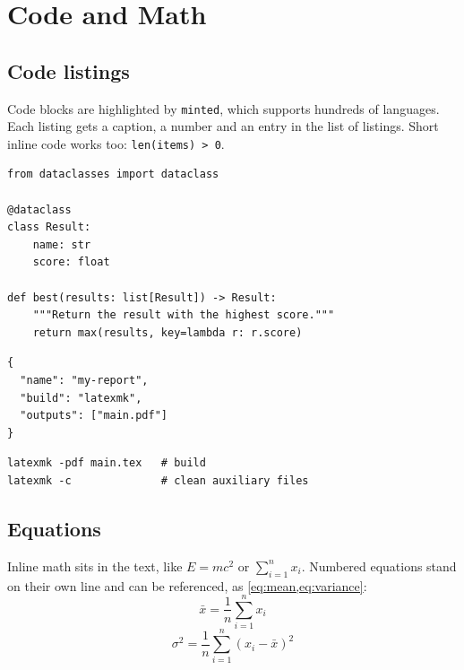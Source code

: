 \chapter{Code and Math}
\label{chap:code-math}

\section{Code listings}

Code blocks are highlighted by \texttt{minted}, which supports hundreds of
languages. Each listing gets a caption, a number and an entry in the list of
listings. Short inline code works too: \texttt{len(items) > 0}.

\begin{listing}[H]
  \begin{verbatim}
from dataclasses import dataclass

@dataclass
class Result:
    name: str
    score: float

def best(results: list[Result]) -> Result:
    """Return the result with the highest score."""
    return max(results, key=lambda r: r.score)
  \end{verbatim}
  \caption{Python.}
  \label{lst:python}
\end{listing}

\begin{listing}[H]
  \begin{verbatim}
{
  "name": "my-report",
  "build": "latexmk",
  "outputs": ["main.pdf"]
}
  \end{verbatim}
  \caption{JSON.}
  \label{lst:json}
\end{listing}

\begin{listing}[H]
  \begin{verbatim}
latexmk -pdf main.tex   # build
latexmk -c              # clean auxiliary files
  \end{verbatim}
  \caption{Shell commands, without line numbers.}
  \label{lst:bash}
\end{listing}

\section{Equations}

Inline math sits in the text, like $E = mc^2$ or $\sum_{i=1}^{n} x_i$.
Numbered equations stand on their own line and can be referenced, as
\cref{eq:mean,eq:variance}:
\begin{equation}
  \bar{x} = \frac{1}{n} \sum_{i=1}^{n} x_i
  \label{eq:mean}
\end{equation}
\begin{equation}
  \sigma^2 = \frac{1}{n} \sum_{i=1}^{n} \left( x_i - \bar{x} \right)^2
  \label{eq:variance}
\end{equation}

